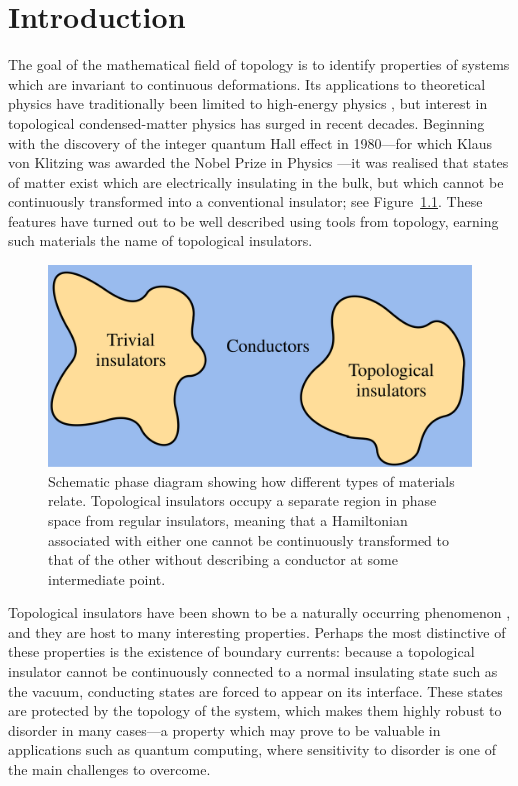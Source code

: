 \chapter{Introduction}

The goal of the mathematical field of topology is to identify properties of systems which are invariant to continuous deformations. Its applications to theoretical physics have traditionally been limited to high-energy physics \cite{Simon_history}, but interest in topological condensed-matter physics has surged in recent decades. Beginning with the discovery of the integer quantum Hall effect in 1980---for which Klaus von Klitzing was awarded the Nobel Prize in Physics \cite{Nobel_1985}---it was realised that states of matter exist which are electrically insulating in the bulk, but which cannot be continuously transformed into a conventional insulator; see Figure~\ref{fig:topo-insulators}. These features have turned out to be well described using tools from topology, earning such materials the name of topological insulators.
\begin{figure}[htb!]
	\centering
	\includegraphics[width=.7\linewidth]{Images/topo-insulators}
	\caption{Schematic phase diagram showing how different types of materials relate. Topological insulators occupy a separate region in phase space from regular insulators, meaning that a Hamiltonian associated with either one cannot be continuously transformed to that of the other without describing a conductor at some intermediate point.}
	\label{fig:topo-insulators}
\end{figure}

Topological insulators have been shown to be a naturally occurring phenomenon \cite{Gehring_natural-TI,Paz_natural-TI}, and they are host to many interesting properties. Perhaps the most distinctive of these properties is the existence of boundary currents: because a topological insulator cannot be continuously connected to a normal insulating state such as the vacuum, conducting states are forced to appear on its interface. These states are protected by the topology of the system, which makes them highly robust to disorder in many cases---a property which may prove to be valuable in applications such as quantum computing, where sensitivity to disorder is one of the main challenges to overcome.

